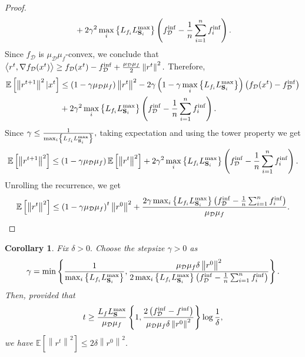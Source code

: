 \documentclass{article}
\newcommand{\bb}{\mathbb}
\newcommand{\Exp}[1]{{\bb E}\left[#1\right]}
\theoremstyle{plain}
\newtheorem{corollary}{Corollary}
\newcommand{\tf}{f_{\mathcal{D}}}
\newcommand{\mS}{{\bf S}}
\theoremstyle{plain}
\theoremstyle{definition}
\theoremstyle{remark}
\begin{document}
\begin{proof}
\begin{equation*}
\begin{split}
			& + 2\gamma^2\max_i\left\lbrace L_{f_i}L_{\mS_i}^{\max} \right\rbrace \left(\tf^{\inf} - \frac{1}{n}\sum_{i=1}^{n}f_i^{\inf}\right).\\
		\end{split}
	\end{equation*}
	Since $\tf$ is $\mu_{\mathcal{D}}\mu_f$-convex, we conclude that $\big{<}r^t, \nabla \tf(x^t)\big{>}\geq \tf(x^t) - \tf^{\inf} + \frac{\mu_{\mathcal{D}}\mu_f}{2}\left\|r^t\right\|^2.$ Therefore,
	\begin{equation*}
		\begin{split}
			\Exp{\left\|r^{t+1}\right\|^2|x^t} & \leq \left(1-\gamma\mu_{\mathcal{D}}\mu_f\right)\left\|r^t\right\|^2 - 2\gamma\left(1-\gamma\max_i\left\lbrace L_{f_i}L_{\mS_i}^{\max} \right\rbrace\right)\left(\tf(x^t) - \tf^{\inf}\right)\\
			& + 2\gamma^2\max_i\left\lbrace L_{f_i}L_{\mS_i}^{\max} \right\rbrace \left(\tf^{\inf} - \frac{1}{n}\sum_{i=1}^{n}f_i^{\inf}\right).\\
		\end{split}
	\end{equation*}
	Since $\gamma \leq \frac{1}{\max_i\left\lbrace L_{f_i}L_{\mS_i}^{\max} \right\rbrace},$ taking expectation and using the tower property we get
	\begin{equation*}
		\begin{split}
			\Exp{\left\|r^{t+1}\right\|^2} & \leq \left(1-\gamma\mu_{\mathcal{D}}\mu_f\right)\Exp{\left\|r^t\right\|^2} + 2\gamma^2\max_i\left\lbrace L_{f_i}L_{\mS_i}^{\max} \right\rbrace \left(\tf^{\inf} - \frac{1}{n}\sum_{i=1}^{n}f_i^{\inf}\right).\\
		\end{split}
	\end{equation*}
	Unrolling the recurrence, we get
	\begin{equation*}
		\Exp{\left\|r^{t}\right\|^2} \leq \left(1-\gamma\mu_{\mathcal{D}}\mu_f\right)^t\left\|r^0\right\|^2 + \frac{2\gamma\max_i\left\lbrace L_{f_i}L_{\mS_i}^{\max} \right\rbrace \left(\tf^{\inf} - \frac{1}{n}\sum_{i=1}^{n}f_i^{\inf}\right)}{\mu_{\mathcal{D}}\mu_f}.
	\end{equation*}
\end{proof}
\begin{corollary}
	Fix $\delta > 0.$ Choose the stepsize $\gamma>0$ as
	\begin{equation*}
		\gamma = \min\left\lbrace \frac{1}{\max_i\left\lbrace L_{f_i}L_{\mS_i}^{\max} \right\rbrace}, \frac{\mu_{\mathcal{D}}\mu_f\delta\left\|r^0\right\|^2}{2\max_i\left\lbrace L_{f_i}L_{\mS_i}^{\max} \right\rbrace \left(\tf^{\inf} - \frac{1}{n}\sum_{i=1}^{n}f_i^{\inf}\right)}\right\rbrace.
	\end{equation*}
	Then, provided that
	\begin{equation*}
		t \geq \frac{L_fL_{\mS}^{\max}}{\mu_{\mathcal{D}}\mu_f}\left\lbrace 1, \frac{2\left(\tf^{\inf} - f^{\inf}\right)}{\mu_{\mathcal{D}}\mu_f\delta\left\|r^0\right\|^2}\right\rbrace \log\frac{1}{\delta},
	\end{equation*}
	we have $\Exp{\left\|r^{t}\right\|^2} \leq 2\delta\left\|r^0\right\|^2.$
\end{corollary}
\end{document}

